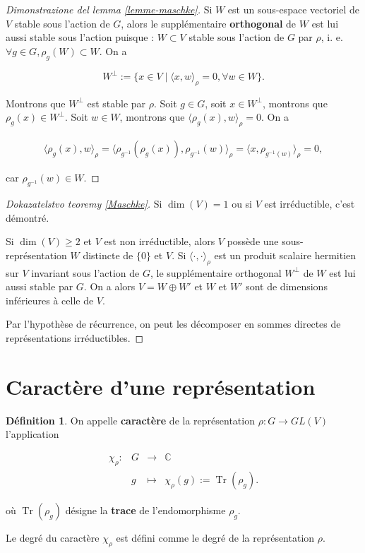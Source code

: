 \documentclass[french]{book}
\theoremstyle{definition}
\newtheorem{protodefinition}{Définition}[section]
\newenvironment{definition}
    {\colorlet{shadecolor}{green!5}\begin{shaded}\begin{protodefinition}}
    {\end{protodefinition}\end{shaded}}
\theoremstyle{remark}
\begin{document}
\begin{proof}[Dimonstrazione del lemma \ref{lemme-maschke}]
  Si \(W\) est un sous-espace vectoriel de \(V\) stable sous l'action de \(G\), alors le supplémentaire \textbf{orthogonal} de \(W\) est lui aussi stable sous l'action puisque : \(W \subset V\) stable sous l'action de \(G\) par \(\rho\), i. e. \( \forall g \in G, \rho_g(W) \subset W\). On a

  \[W ^{\perp} := \{  x \in V \mid \langle x, w \rangle _{\rho} = 0,  \forall w \in W \}.\]

  Montrons que \( W ^{\perp}\) est stable par \(\rho\). Soit \(g \in G\), soit \(x \in W ^{\perp}\), montrons que \(\rho_g(x) \in W ^{\perp}\). Soit \(w \in W\), montrons que \(\langle \rho_g(x), w \rangle _{\rho}=0\). On a

  \begin{gather*}
    \langle \rho_g(x), w \rangle_{\rho} = \langle \rho _{g ^{-1} }(\rho_g(x)), \rho _{g ^{-1} }(w) \rangle _{\rho} = \langle x, \rho _{g ^{-1} (w)} \rangle _{\rho} = 0,
  \end{gather*}

  car \(\rho _{g ^{-1} }(w) \in W\).
\end{proof}

\begin{proof}[Dokazatelstvo teoremy \ref{Maschke}]
  Si \(\operatorname{dim}(V)=1\) ou si \(V\) est irréductible, c'est démontré.

  Si \(\operatorname{dim}(V) \geq 2\) et \(V\) est non irréductible, alors \(V\) possède une sous-représentation \(W\) distincte de \(\{ 0 \} \) et \(V\). Si \(\langle \cdot, \cdot \rangle _{\rho}\) est un produit scalaire hermitien sur \(V\) invariant sous l'action de \(G\), le supplémentaire orthogonal \(W ^{\perp}\) de \(W\) est lui aussi stable par \(G\). On a alors \(V = W \oplus W'\) et \(W\) et \(W'\) sont de dimensions inférieures à celle de \(V\).

  Par l'hypothèse de récurrence, on peut les décomposer en sommes directes de représentations irréductibles.
\end{proof}

\section{Caractère d'une représentation}

\begin{definition}
  On appelle \textbf{caractère} de la représentation \(\rho : G \longrightarrow GL(V)\) l'application

  \[\begin{matrix}
  \chi_{\rho} : & G & \longrightarrow & \mathbb{C} \\
  \ & g & \longmapsto & \chi_{\rho}(g) := \operatorname{Tr}(\rho_g).
  \end{matrix}\]

  où \(\operatorname{Tr}(\rho_g)\) désigne la \textbf{trace} de l'endomorphisme \(\rho_g\).

  Le degré du caractère \(\chi_\rho\) est défini comme le degré de la représentation \(\rho\).
\end{definition}
\end{document}

